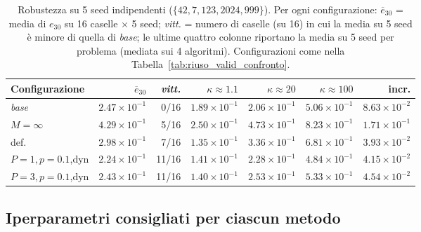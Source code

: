 \begin{table}[H]
\centering
\footnotesize
\renewcommand{\arraystretch}{1.1}
\setlength{\tabcolsep}{3.5pt}
\caption{Robustezza su 5 seed indipendenti ($\{42,7,123,2024,999\}$). Per ogni configurazione: $\overline{e}_{30}$ = media di $e_{30}$ su 16 caselle $\times$ 5 seed; \emph{vitt.} = numero di caselle (su 16) in cui la media su 5 seed è minore di quella di \emph{base}; le ultime quattro colonne riportano la media su 5 seed per problema (mediata sui 4 algoritmi). Configurazioni come nella Tabella~\ref{tab:riuso_valid_confronto}.}
\label{tab:riuso_valid_robustezza}
\begin{tabular}{@{}lrrrrrr@{}}
\toprule
Configurazione & $\overline{e}_{30}$ & \emph{vitt.} & $\kappa{\approx}1.1$ & $\kappa{\approx}20$ & $\kappa{\approx}100$ & incr.\\
\midrule
\emph{base} & $2.47\times10^{-1}$ & 0/16 & $1.89\times10^{-1}$ & $2.06\times10^{-1}$ & $5.06\times10^{-1}$ & $8.63\times10^{-2}$\\
$M{=}\infty$ & $4.29\times10^{-1}$ & 5/16 & $2.50\times10^{-1}$ & $4.73\times10^{-1}$ & $8.23\times10^{-1}$ & $1.71\times10^{-1}$\\
\midrule
def. & $2.98\times10^{-1}$ & 7/16 & $1.35\times10^{-1}$ & $3.36\times10^{-1}$ & $6.81\times10^{-1}$ & $3.93\times10^{-2}$\\
$P{=}1,p{=}0.1$,dyn & $2.24\times10^{-1}$ & 11/16 & $1.41\times10^{-1}$ & $2.28\times10^{-1}$ & $4.84\times10^{-1}$ & $4.15\times10^{-2}$\\
$P{=}3,p{=}0.1$,dyn & $2.43\times10^{-1}$ & 11/16 & $1.40\times10^{-1}$ & $2.53\times10^{-1}$ & $5.33\times10^{-1}$ & $4.54\times10^{-2}$\\
\bottomrule
\end{tabular}
\end{table}

\subsection{Iperparametri consigliati per ciascun metodo}\label{app:riuso-consigliati}


